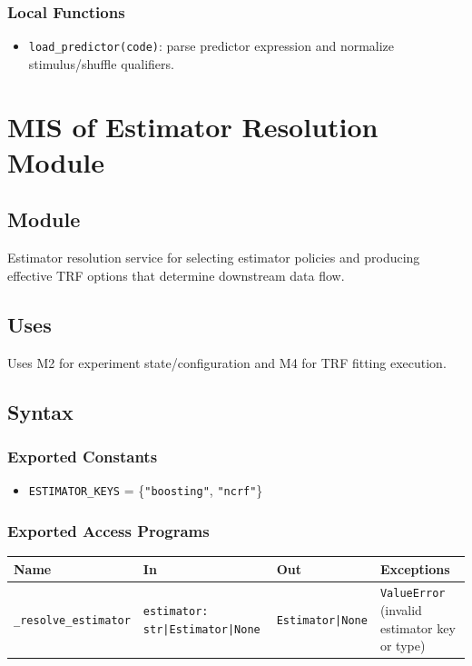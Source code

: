 \documentclass[12pt, titlepage]{article}
\begin{document}
\subsubsection{Local Functions}

\begin{itemize}
\item \texttt{load\_predictor(code)}: parse predictor expression and normalize
stimulus/shuffle qualifiers.

\end{itemize}

\newpage
\section{MIS of Estimator Resolution Module} \label{MIS:Estimator}

\subsection{Module}

Estimator resolution service for selecting estimator policies and producing
effective TRF options that determine downstream data flow.
\subsection{Uses}
Uses M2 for experiment state/configuration and M4 for TRF fitting execution.

\subsection{Syntax}

\subsubsection{Exported Constants}
\begin{itemize}
\item \texttt{ESTIMATOR\_KEYS} = \{\texttt{"boosting"}, \texttt{"ncrf"}\}
\end{itemize}

\subsubsection{Exported Access Programs}

\begin{center}
\begin{tabular}{p{3cm} p{4cm} p{4cm} p{3cm}}
\hline
\textbf{Name} & \textbf{In} & \textbf{Out} & \textbf{Exceptions} \\
\hline
\texttt{\_resolve\_estimator} &
\texttt{estimator: str|Estimator|None} &
\texttt{Estimator|None} &
\texttt{ValueError} (invalid estimator key or type) \\
\hline
\end{tabular}
\end{center}
\end{document}
